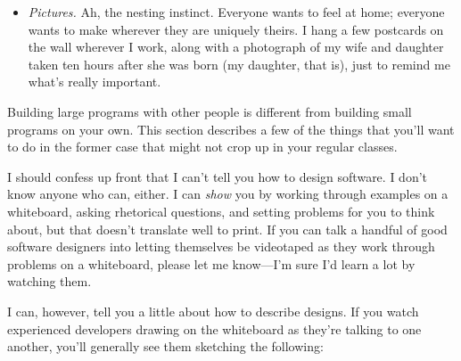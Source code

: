 \documentclass{report}
\begin{document}
\begin{itemize}
  \item \emph{Pictures.} Ah, the nesting instinct.  Everyone wants to
  feel at home; everyone wants to make wherever they are uniquely
  theirs.  I hang a few postcards on the wall wherever I work, along
  with a photograph of my wife and daughter taken ten hours after she
  was born (my daughter, that is), just to remind me what's really
  important.

\end{itemize}


Building large programs with other people is different from building
small programs on your own.  This section describes a few of the
things that you'll want to do in the former case that might not crop
up in your regular classes.

I should confess up front that I can't tell you how to design
software.  I don't know anyone who can, either.  I can \emph{show} you
by working through examples on a whiteboard, asking rhetorical
questions, and setting problems for you to think about, but that
doesn't translate well to print.  If you can talk a handful of good
software designers into letting themselves be videotaped as they work
through problems on a whiteboard, please let me know---I'm sure I'd
learn a lot by watching them.


I can, however, tell you a little about how to describe designs.  If
you watch experienced developers drawing on the whiteboard as they're
talking to one another, you'll generally see them sketching the
following:
\end{document}
